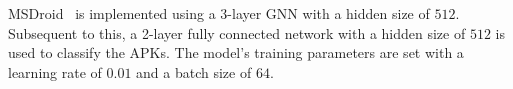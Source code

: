 MSDroid~\cite{he2022msdroid} is implemented using a 3-layer GNN with a hidden size of $512$.
Subsequent to this, a 2-layer fully connected network with a hidden size of $512$ is used to classify the APKs.
The model's training parameters are set with a learning rate of $0.01$ and a batch size of $64$.




